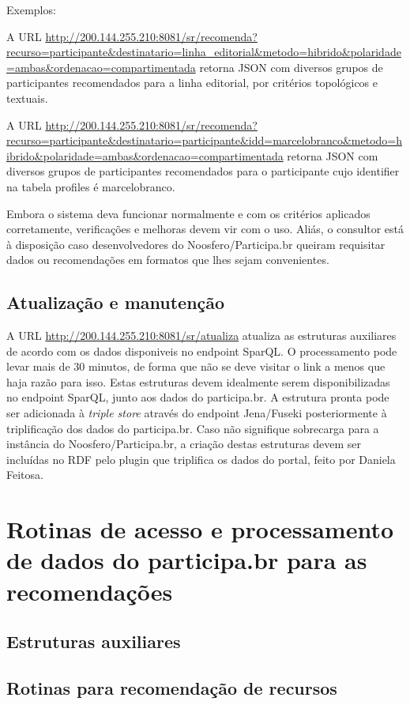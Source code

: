 \documentclass[12pt]{article}
\begin{document}
Exemplos:

A URL \url{http://200.144.255.210:8081/sr/recomenda?recurso=participante&destinatario=linha_editorial&metodo=hibrido&polaridade=ambas&ordenacao=compartimentada} retorna JSON com diversos grupos de participantes recomendados para a linha editorial, por critérios topológicos e textuais.

A URL \url{http://200.144.255.210:8081/sr/recomenda?recurso=participante&destinatario=participante&idd=marcelobranco&metodo=hibrido&polaridade=ambas&ordenacao=compartimentada} retorna JSON com diversos grupos de participantes recomendados para o participante cujo identifier na tabela profiles é marcelobranco.

Embora o sistema deva funcionar normalmente e com os critérios aplicados corretamente, verificações e melhoras devem vir com o uso. Aliás, o consultor está à disposição caso desenvolvedores do Noosfero/Participa.br queiram requisitar dados ou recomendações em formatos que lhes sejam convenientes.

\subsection{Atualização e manutenção}
A URL \url{http://200.144.255.210:8081/sr/atualiza} atualiza as estruturas auxiliares de acordo com os dados disponiveis no endpoint SparQL. O processamento pode levar mais de 30 minutos, de forma que não se deve visitar o link a menos que haja razão para isso. Estas estruturas devem idealmente serem disponibilizadas no endpoint SparQL, junto aos dados do participa.br.
A estrutura pronta pode ser adicionada à \emph{triple store} através do endpoint Jena/Fuseki posteriormente à triplificação dos dados do participa.br. Caso não signifique sobrecarga para a instância do Noosfero/Participa.br, a criação destas estruturas devem ser incluídas no RDF pelo plugin que triplifica os dados do portal, feito por Daniela Feitosa.
\section{Rotinas de acesso e processamento de dados do participa.br para as recomendações}\label{sec:algs}
\subsection{Estruturas auxiliares}

\subsection{Rotinas para recomendação de recursos}

\end{document}
